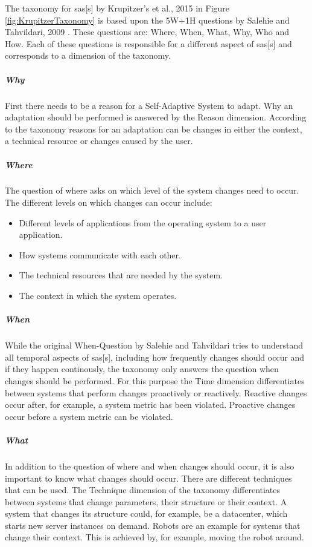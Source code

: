 \noindent The taxonomy for \acrlong{sas}[s] by Krupitzer's et al., 2015 \cite*{SurveyOnEngineeringApproaches} in Figure \ref{fig:KrupitzerTaxonomy}
is based upon the 5W+1H questions by Salehie and Tahvildari, 2009 \cite*{LandscapeAndResearchChallenges}.
These questions are: Where, When, What, Why, Who and How.
Each of these questions is responsible for a different aspect of \acrlong{sas}[s] and corresponds to a dimension of the taxonomy.

\subparagraph*{Why}
First there needs to be a reason for a Self-Adaptive System to adapt. Why an adaptation should be performed is answered by the Reason dimension.
According to the taxonomy reasons for an adaptation can be changes in either the context, a technical resource or changes caused by the user.

\subparagraph*{Where}
The question of where asks on which level of the system changes need to occur.
The different levels on which changes can occur include:
\begin{itemize}[nosep]
    \item Different levels of applications from the operating system to a user application.
    \item How systems communicate with each other.
    \item The technical resources that are needed by the system.
    \item The context in which the system operates.
\end{itemize}

\subparagraph*{When}
While the original When-Question by Salehie and Tahvildari tries to understand all temporal aspects of \acrlong{sas}[s],
including how frequently changes should occur and if they happen continously,
the taxonomy only answers the question when changes should be performed.
For this purpose the Time dimension differentiates between systems that perform changes proactively or reactively.
Reactive changes occur after, for example, a system metric has been violated.
Proactive changes occur before a system metric can be violated.

\subparagraph*{What}
In addition to the question of where and when changes should occur, it is also important to know
what changes should occur. There are different techniques that can be used.
The Technique dimension of the taxonomy differentiates between systems that change parameters, their structure or their context.
A system that changes its structure could, for example, be a datacenter, which starts new server instances on demand.
Robots are an example for systems that change their context.
This is achieved by, for example, moving the robot around.


